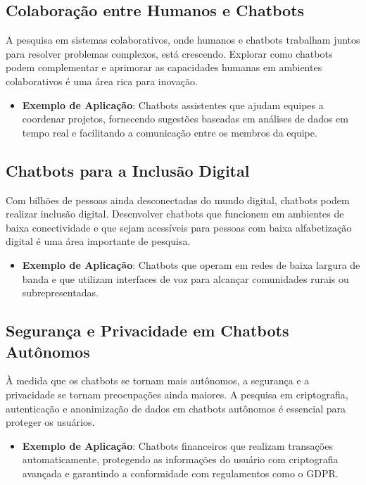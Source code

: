 \documentclass[14pt,a4paper,oneside]{book}
\begin{document}
\subsection{Colaboração entre Humanos e Chatbots}

A pesquisa em sistemas colaborativos, onde humanos e chatbots trabalham juntos para resolver problemas complexos, está crescendo. Explorar como chatbots podem complementar e aprimorar as capacidades humanas em ambientes colaborativos é uma área rica para inovação.

\begin{itemize}
	\item \textbf{Exemplo de Aplicação}: Chatbots assistentes que ajudam equipes a coordenar projetos, fornecendo sugestões baseadas em análises de dados em tempo real e facilitando a comunicação entre os membros da equipe.
\end{itemize}

\subsection{Chatbots para a Inclusão Digital}

Com bilhões de pessoas ainda desconectadas do mundo digital, chatbots podem realizar inclusão digital. Desenvolver chatbots que funcionem em ambientes de baixa conectividade e que sejam acessíveis para pessoas com baixa alfabetização digital é uma área importante de pesquisa.

\begin{itemize}
	\item \textbf{Exemplo de Aplicação}: Chatbots que operam em redes de baixa largura de banda e que utilizam interfaces de voz para alcançar comunidades rurais ou subrepresentadas.
\end{itemize}

\subsection{Segurança e Privacidade em Chatbots Autônomos}

À medida que os chatbots se tornam mais autônomos, a segurança e a privacidade se tornam preocupações ainda maiores. A pesquisa em criptografia, autenticação e anonimização de dados em chatbots autônomos é essencial para proteger os usuários.

\begin{itemize}
	\item \textbf{Exemplo de Aplicação}: Chatbots financeiros que realizam transações automaticamente, protegendo as informações do usuário com criptografia avançada e garantindo a conformidade com regulamentos como o GDPR.
\end{itemize}
\end{document}
